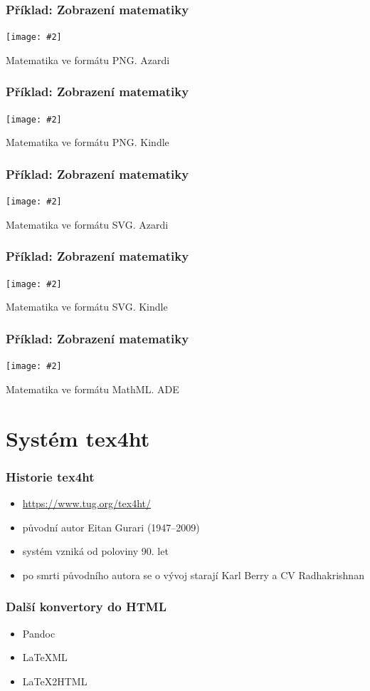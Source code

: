 \documentclass[czech]{beamer}
\newcommand\myfig[3][width=.9\textwidth]{%
  \figure\texttt{[image: \#2]}%
  \caption{#3}%
\endfigure}
\begin{document}
\begin{frame}
  \frametitle{Příklad: Zobrazení matematiky}
  {\myfig{examples/png-epub.png}{Matematika ve formátu PNG. Azardi}}
\end{frame}
\begin{frame}
  \frametitle{Příklad: Zobrazení matematiky}
  {\myfig{examples/png-mobi.png}{Matematika ve formátu PNG. Kindle}}
\end{frame}
\begin{frame}
  \frametitle{Příklad: Zobrazení matematiky}
  \myfig{examples/svg-epub.png}{Matematika ve formátu SVG. Azardi}
\end{frame}
\begin{frame}
  \frametitle{Příklad: Zobrazení matematiky}
  \myfig[height=0.6\paperheight]{examples/svg-mobi.png}{Matematika ve formátu SVG. Kindle}
\end{frame}
\begin{frame}
  \frametitle{Příklad: Zobrazení matematiky}
  \myfig{examples/mathml-ade.png}{Matematika ve formátu MathML. ADE}
\end{frame}

  \section{Systém tex4ht}
\begin{frame}
  \frametitle{Historie tex4ht}
  \begin{itemize}
    \item \url{https://www.tug.org/tex4ht/}
    \item původní autor Eitan Gurari (1947--2009)
    \item systém vzniká od poloviny 90. let
    \item po smrti původního autora se o vývoj starají Karl Berry a CV Radhakrishnan
  \end{itemize}
\end{frame}

\begin{frame}
  \frametitle{Další konvertory do HTML}
  \begin{itemize}
    \item Pandoc
    \item LaTeXML
    \item LaTeX2HTML
  \end{itemize}
\end{frame}
\end{document}
